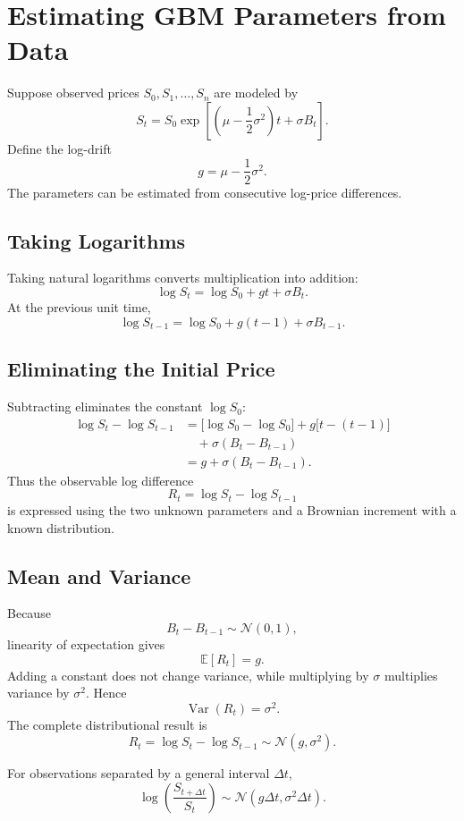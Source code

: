 \documentclass[12pt,openany]{book}
\theoremstyle{definition}
\theoremstyle{remark}
\newcommand{\E}{\mathbb{E}}
\DeclareMathOperator{\Var}{Var}
\begin{document}
\section{Estimating GBM Parameters from Data}

Suppose observed prices \(S_0,S_1,\ldots,S_n\) are modeled by
\[
S_t
=S_0\exp\!\left[
\left(\mu-\frac12\sigma^2\right)t+\sigma B_t
\right].
\]
Define the log-drift
\[
g=\mu-\frac12\sigma^2.
\]
The parameters can be estimated from consecutive log-price differences.

\subsection{Taking Logarithms}

Taking natural logarithms converts multiplication into addition:
\[
\log S_t
=\log S_0+gt+\sigma B_t.
\]
At the previous unit time,
\[
\log S_{t-1}
=\log S_0+g(t-1)+\sigma B_{t-1}.
\]

\subsection{Eliminating the Initial Price}

Subtracting eliminates the constant \(\log S_0\):
\[
\begin{aligned}
\log S_t-\log S_{t-1}
&=\bigl[\log S_0-\log S_0\bigr]
  +g\bigl[t-(t-1)\bigr]\\
&\quad+\sigma(B_t-B_{t-1})\\
&=g+\sigma(B_t-B_{t-1}).
\end{aligned}
\]
Thus the observable log difference
\[
R_t=\log S_t-\log S_{t-1}
\]
is expressed using the two unknown parameters and a Brownian increment with
a known distribution.

\subsection{Mean and Variance}

Because
\[
B_t-B_{t-1}\sim\mathcal{N}(0,1),
\]
linearity of expectation gives
\[
\boxed{
\E[R_t]=g.
}
\]
Adding a constant does not change variance, while multiplying by
\(\sigma\) multiplies variance by \(\sigma^2\). Hence
\[
\boxed{
\Var(R_t)=\sigma^2.
}
\]
The complete distributional result is
\[
\boxed{
R_t
=\log S_t-\log S_{t-1}
\sim\mathcal{N}(g,\sigma^2).
}
\]

For observations separated by a general interval \(\Delta t\),
\[
\log\!\left(\frac{S_{t+\Delta t}}{S_t}\right)
\sim
\mathcal{N}(g\Delta t,\sigma^2\Delta t).
\]
\end{document}
